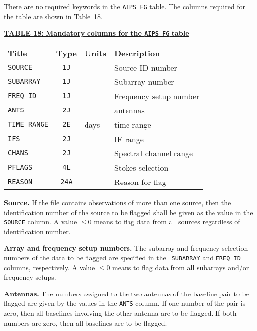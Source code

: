 \documentclass[twoside]{article}
\begin{document}
There are no required keywords in the {\tt AIPS FG} table.  The
columns required for the table are shown in Table~18.

\begin{center}
\underline{\bf{TABLE 18: Mandatory columns for the {\tt AIPS FG} table}}\\
\begin{tabular}{lcll}
\noalign{\vspace{2pt}} \label{ta:FGcols}
\underline{{\bf Title\vphantom{y}}} & \underline{\bf{Type}} &
   \underline{{\bf Units\vphantom{y}}} & \underline{\bf{Description}} \\
\noalign{\vspace{2pt}}
{\tt SOURCE}   & {\tt 1J} &  & Source ID number \\
{\tt SUBARRAY} & {\tt 1J} &  & Subarray number \\
{\tt FREQ ID}  & {\tt 1J} &  & Frequency setup number \\
{\tt ANTS}     & {\tt 2J} &  & antennas \\
{\tt TIME RANGE} & {\tt 2E} & days & time range \\
{\tt IFS}      & {\tt 2J} &  & IF range \\
{\tt CHANS}    & {\tt 2J} &  & Spectral channel range \\
{\tt PFLAGS}   & {\tt 4L} &  & Stokes selection \\
{\tt REASON}   & {\tt 24A} & & Reason for flag
\end{tabular}
\end{center}

{\bf Source.}  If the file contains observations of more than one
source, then the identification number of the source to be flagged
shall be given as the value in the {\tt SOURCE} column.  A value
$\leq 0$ means to flag data from all sources regardless of
identification number.

{\bf Array and frequency setup numbers.}  The subarray and frequency
selection numbers of the data to be flagged are specified in the {\tt
  SUBARRAY} and {\tt FREQ ID} columns, respectively.    A value
$\leq 0$ means to flag data from all subarrays and/or frequency setups.

{\bf Antennas.}  The numbers assigned to the two antennas of the
baseline pair to be flagged are given by the values in the {\tt ANTS}
column.  If one number of the pair is zero, then all baselines
involving the other antenna are to be flagged.  If both numbers are
zero, then all baselines are to be flagged.
\end{document}
